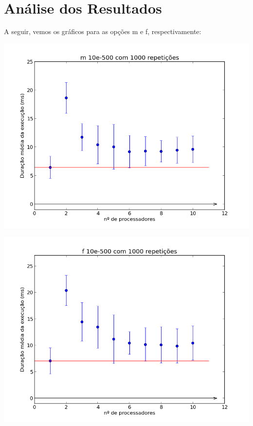 \documentclass[a4paper,11pt]{article} %
\begin{document}
\section{Análise dos Resultados}
  A seguir, vemos os gráficos para as opções m e f, respectivamente:
  \centerline{\includegraphics[width=\linewidth]{Dados/m_plot.png}}
  \centerline{\includegraphics[width=\linewidth]{Dados/f_plot.png}}
  
\end{document}

